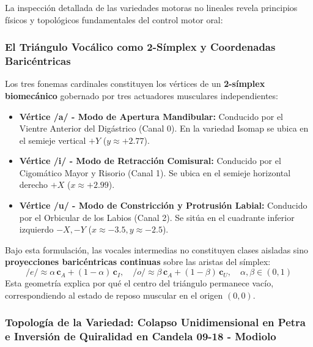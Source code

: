 \documentclass[11pt,a4paper,openany]{book}
\theoremstyle{definition}
\begin{document}
La inspección detallada de las variedades motoras no lineales revela principios físicos y topológicos fundamentales del control motor oral:

\subsubsection{El Triángulo Vocálico como 2-Símplex y Coordenadas Baricéntricas}
\label{subsubsec:simplex_baricentrico}

Los tres fonemas cardinales constituyen los vértices de un \textbf{2-símplex biomecánico} gobernado por tres actuadores musculares independientes:
\begin{itemize}
    \item \textbf{Vértice /a/ - Modo de Apertura Mandibular:} Conducido por el Vientre Anterior del Digástrico (Canal 0). En la variedad Isomap se ubica en el semieje vertical $+Y$ ($y \approx +2.77$).
    \item \textbf{Vértice /i/ - Modo de Retracción Comisural:} Conducido por el Cigomático Mayor y Risorio (Canal 1). Se ubica en el semieje horizontal derecho $+X$ ($x \approx +2.99$).
    \item \textbf{Vértice /u/ - Modo de Constricción y Protrusión Labial:} Conducido por el Orbicular de los Labios (Canal 2). Se sitúa en el cuadrante inferior izquierdo $-X, -Y$ ($x \approx -3.5, y \approx -2.5$).
\end{itemize}

Bajo esta formulación, las vocales intermedias no constituyen clases aisladas sino \textbf{proyecciones baricéntricas continuas} sobre las aristas del símplex:
\begin{equation}
    /e/ \approx \alpha \, \mathbf{c}_A + (1-\alpha) \, \mathbf{c}_I, \quad /o/ \approx \beta \, \mathbf{c}_A + (1-\beta) \, \mathbf{c}_U, \quad \alpha, \beta \in (0, 1)
\end{equation}
Esta geometría explica por qué el centro del triángulo permanece vacío, correspondiendo al estado de reposo muscular en el origen $(0, 0)$.

\subsubsection{Topología de la Variedad: Colapso Unidimensional en Petra e Inversión de Quiralidad en Candela 09-18 - Modiolo}
\label{subsubsec:quiralidad_modiolo}
\end{document}
